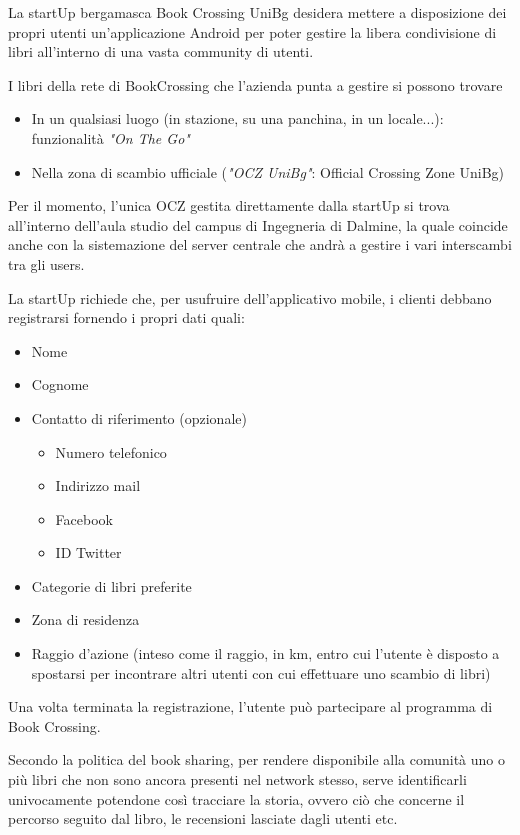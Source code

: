 La startUp bergamasca Book Crossing UniBg desidera mettere a disposizione dei propri
utenti un'applicazione Android per poter gestire la libera condivisione di libri all'interno di una vasta community di utenti.

I libri della rete di BookCrossing che l'azienda punta a gestire si possono trovare
\begin{itemize}
	\item In un qualsiasi luogo (in stazione, su una panchina, in un locale...): funzionalità \textit{"On The Go"}
	\item Nella zona di scambio ufficiale (\textit{"OCZ UniBg"}: Official Crossing Zone UniBg)
\end{itemize}

Per il momento, l'unica OCZ gestita direttamente dalla startUp si trova all'interno dell'aula studio del campus di Ingegneria di Dalmine, la quale coincide anche con la sistemazione del server centrale che andrà a gestire i vari interscambi tra gli users.

La startUp richiede che, per usufruire dell'applicativo mobile, i clienti debbano registrarsi fornendo i propri dati quali:
\begin{itemize}
	\item Nome
	\item Cognome
	\item Contatto di riferimento (opzionale)
	\begin{itemize}
		\item Numero telefonico
		\item Indirizzo mail
		\item Facebook
		\item ID Twitter
	\end{itemize}
	\item Categorie di libri preferite
	\item Zona di residenza
	\item Raggio d'azione (inteso come il raggio, in km, entro cui l'utente è disposto a spostarsi per incontrare altri utenti con cui effettuare uno scambio di libri)
\end{itemize}

Una volta terminata la registrazione, l'utente può partecipare al programma di Book Crossing.

Secondo la politica del book sharing, per rendere disponibile alla comunità 
uno o più libri che non sono ancora presenti nel network stesso, 
serve
identificarli univocamente potendone così tracciare la storia, ovvero ciò 
che concerne il percorso seguito dal libro, le recensioni lasciate dagli utenti etc.

